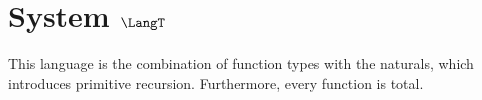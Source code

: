 \section{System $\LangT$}
This language is the combination of function types with the naturals, which introduces
primitive recursion. Furthermore, every function is total.







